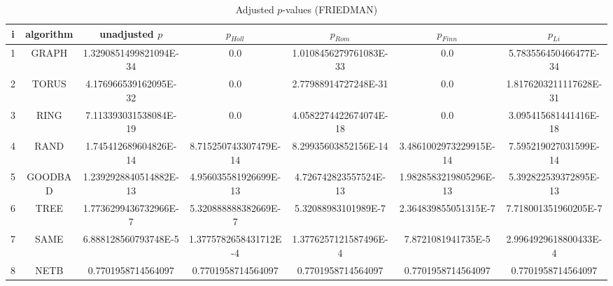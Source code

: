 \documentclass[a4paper,10pt]{article}
\begin{document}
\begin{landscape}
\begin{table}[!htp]
\centering\scriptsize
\caption{Adjusted $p$-values (FRIEDMAN)}
\begin{tabular}{ccccccc}
i&algorithm&unadjusted $p$&$p_{Holl}$&$p_{Rom}$&$p_{Finn}$&$p_{Li}$\\
\hline
1& GRAPH&1.3290851499821094E-34&0.0&1.0108456279761083E-33&0.0&5.783556450466477E-34\\
2& TORUS&4.176966539162095E-32&0.0&2.77988914727248E-31&0.0&1.8176203211117628E-31\\
3& RING&7.113393031538084E-19&0.0&4.0582274422674074E-18&0.0&3.095415681441416E-18\\
4& RAND&1.745412689604826E-14&8.715250743307479E-14&8.29935603852156E-14&3.4861002973229915E-14&7.595219027031599E-14\\
5& GOODBAD&1.2392928840514882E-13&4.956035581926699E-13&4.726742823557524E-13&1.9828583219805296E-13&5.392822539372895E-13\\
6& TREE&1.7736299436732966E-7&5.320888888382669E-7&5.32088983101989E-7&2.364839855051315E-7&7.718001351960205E-7\\
7& SAME&6.888128560793748E-5&1.3775782658431712E-4&1.3776257121587496E-4&7.8721081941735E-5&2.9964929618800433E-4\\
8& NETB&0.7701958714564097&0.7701958714564097&0.7701958714564097&0.7701958714564097&0.7701958714564097\\
\hline
\end{tabular}
\end{table}


\newpage


\end{landscape}
\end{document}
